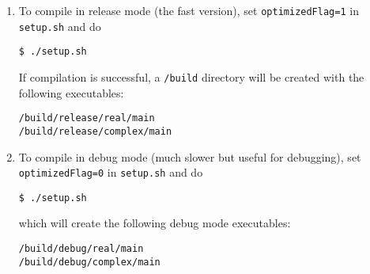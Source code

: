 \begin{enumerate}
\item To compile \dftfe{} in release mode (the fast version), set \verb|optimizedFlag=1| in \verb|setup.sh| and do
\begin{verbatim}
$ ./setup.sh
\end{verbatim} 
If compilation is successful, a \verb|/build| directory will be created with the following executables:
\begin{verbatim}
/build/release/real/main
/build/release/complex/main
\end{verbatim}

\item
To compile \dftfe{} in debug mode (much slower but useful for debugging), set \verb|optimizedFlag=0| in \verb|setup.sh| and do
\begin{verbatim}
$ ./setup.sh
\end{verbatim}
which will create the following debug mode executables:
\begin{verbatim}
/build/debug/real/main
/build/debug/complex/main
\end{verbatim}
\end{enumerate}
